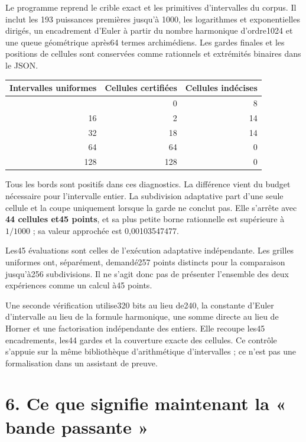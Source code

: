 \documentclass[
  11pt,
]{article}
\begin{document}
Le programme reprend le crible exact et les primitives d'intervalles du
corpus. Il inclut les 193 puissances premières jusqu'à 1000, les
logarithmes et exponentielles dirigés, un encadrement d'Euler à partir
du nombre harmonique d'ordre1024 et une queue géométrique après64 termes
archimédiens. Les gardes finales et les positions de cellules sont
conservées comme rationnels et extrémités binaires dans le JSON.

\begin{longtable}[]{@{}rrr@{}}
\toprule\noalign{}
Intervalles uniformes & Cellules certifiées & Cellules indécises \\
\midrule\noalign{}
\endhead
\bottomrule\noalign{}
\endlastfoot
8 & 0 & 8 \\
16 & 2 & 14 \\
32 & 18 & 14 \\
64 & 64 & 0 \\
128 & 128 & 0 \\
\end{longtable}

Tous les bords sont positifs dans ces diagnostics. La différence vient
du budget nécessaire pour l'intervalle entier. La subdivision adaptative
part d'une seule cellule et la coupe uniquement lorsque la garde ne
conclut pas. Elle s'arrête avec \textbf{44 cellules et45 points}, et sa
plus petite borne rationnelle est supérieure à \(1/1000\) ; sa valeur
approchée est 0,00103547477.

Les45 évaluations sont celles de l'exécution adaptative indépendante.
Les grilles uniformes ont, séparément, demandé257 points distincts pour
la comparaison jusqu'à256 subdivisions. Il ne s'agit donc pas de
présenter l'ensemble des deux expériences comme un calcul à45 points.

Une seconde vérification utilise320 bits au lieu de240, la constante
d'Euler d'intervalle au lieu de la formule harmonique, une somme directe
au lieu de Horner et une factorisation indépendante des entiers. Elle
recoupe les45 encadrements, les44 gardes et la couverture exacte des
cellules. Ce contrôle s'appuie sur la même bibliothèque d'arithmétique
d'intervalles ; ce n'est pas une formalisation dans un assistant de
preuve.

\hypertarget{ce-que-signifie-maintenant-la-bande-passante}{%
\section{6. Ce que signifie maintenant la « bande passante
»}\label{ce-que-signifie-maintenant-la-bande-passante}}
\end{document}
